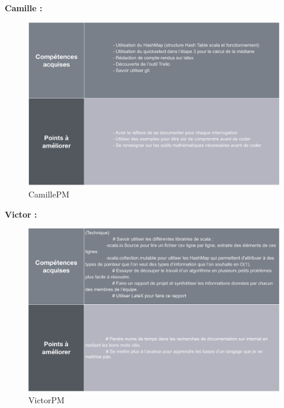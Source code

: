 \documentclass{article}
\begin{document}
    \newpage
    
    \textbf{Camille :}
    \begin{figure}[H]
        \centering
        \includegraphics[scale=0.45]{CamillePM.png}
        \caption{CamillePM}
        \label{fig:camillepm}
    \end{figure}
    
    \textbf{Victor :}
    \begin{figure}[H]
        \centering
        \includegraphics[scale=0.45]{VictorPM.png}
        \caption{VictorPM}
        \label{fig:victorpm}
    \end{figure}
    
    \newpage
    
\end{document}
